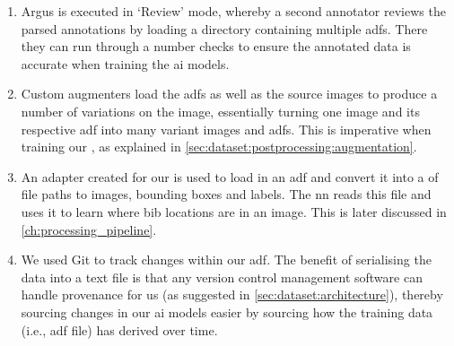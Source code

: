 \begin{enumerate}
  \item Argus is executed in `Review' mode, whereby a second annotator reviews the parsed annotations by loading a directory containing multiple \glspl{adf}. There they can run through a number checks to ensure the annotated data is accurate when training the \gls{ai} models.
  \item Custom augmenters load the \glspl{adf} as well as the source images to produce a number of variations on the image, essentially turning one image and its respective \gls{adf} into many variant images and \glspl{adf}. This is imperative when training our , as explained in \cref{sec:dataset:postprocessing:augmentation}.
  \item An adapter created for our  is used to load in an \gls{adf} and convert it into a  of file paths to images, bounding boxes and labels. The \gls{nn} reads this file and uses it to learn where bib locations are in an image. This is later discussed in \cref{ch:processing_pipeline}.
  \item We used Git to track changes within our \gls{adf}. The benefit of serialising the data into a text file is that any version control management software can handle provenance for us (as suggested in \cref{sec:dataset:architecture}), thereby sourcing changes in our \gls{ai} models easier by sourcing how the training data (i.e., \gls{adf} file) has derived over time.
\end{enumerate}





